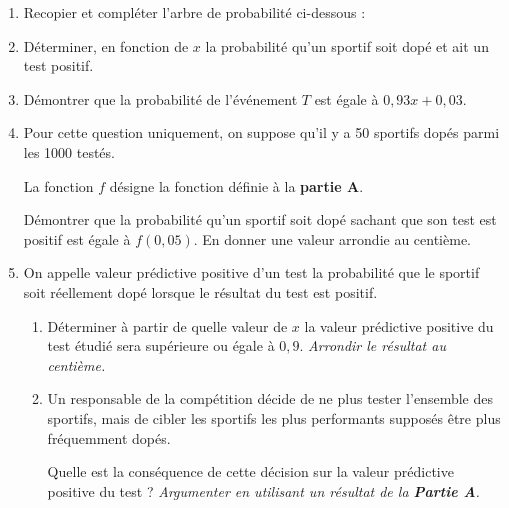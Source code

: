 \begin{enumerate}
	\item Recopier et compléter l'arbre de probabilité ci-dessous :
	
	\begin{Centrage}
	\end{Centrage}
	\item Déterminer, en fonction de $x$ la probabilité qu'un sportif soit dopé et ait un test positif.
	\item Démontrer que la probabilité de l'événement $T$ est égale à $0,93x + 0,03$.
	\item Pour cette question uniquement, on suppose qu'il y a 50 sportifs dopés parmi les \num{1000} testés.
	
	La fonction $f$ désigne la fonction définie à la \textbf{partie A}.
	
	Démontrer que la probabilité qu'un sportif soit dopé sachant que son test est positif est égale à $f(0,05)$. En donner une valeur arrondie au centième.
	\item On appelle valeur prédictive positive d'un test la probabilité que le sportif soit réellement dopé lorsque le résultat du test est positif.
	\begin{enumerate}
		\item Déterminer à partir de quelle valeur de $x$ la valeur prédictive positive du test étudié sera supérieure ou égale à $0,9$. \textit{Arrondir le résultat au centième.}
		\item Un responsable de la compétition décide de ne plus tester l'ensemble des sportifs, mais de cibler les sportifs les plus performants supposés être plus fréquemment dopés.
		
		Quelle est la conséquence de cette décision sur la valeur prédictive positive du test ? \textit{Argumenter en utilisant un résultat de la \textbf{Partie A}.}
	\end{enumerate}
\end{enumerate}